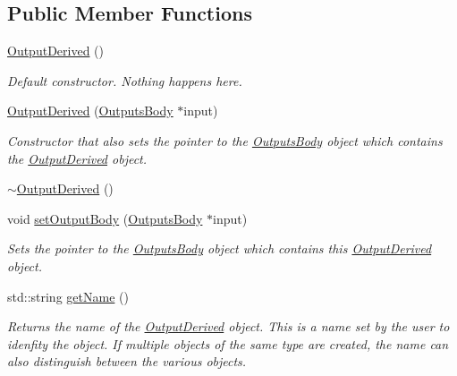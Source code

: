 \subsection*{Public Member Functions}
\begin{DoxyCompactItemize}
\item 
\hyperlink{classosea_1_1ofreq_1_1_output_derived_af8b70b70b8a5089f2b673da8b59a7b6a}{Output\-Derived} ()
\begin{DoxyCompactList}\small\item\em Default constructor. Nothing happens here. \end{DoxyCompactList}\item 
\hyperlink{classosea_1_1ofreq_1_1_output_derived_aa35993ef6d6da030cf74bca52b142ac1}{Output\-Derived} (\hyperlink{classosea_1_1ofreq_1_1_outputs_body}{Outputs\-Body} $\ast$input)
\begin{DoxyCompactList}\small\item\em Constructor that also sets the pointer to the \hyperlink{classosea_1_1ofreq_1_1_outputs_body}{Outputs\-Body} object which contains the \hyperlink{classosea_1_1ofreq_1_1_output_derived}{Output\-Derived} object. \end{DoxyCompactList}\item 
\hyperlink{classosea_1_1ofreq_1_1_output_derived_a4dde733443e52964c74d8bb6477f85f7}{$\sim$\-Output\-Derived} ()
\item 
void \hyperlink{classosea_1_1ofreq_1_1_output_derived_affb9fc146d9322b1d991cc5f5ae546d7}{set\-Output\-Body} (\hyperlink{classosea_1_1ofreq_1_1_outputs_body}{Outputs\-Body} $\ast$input)
\begin{DoxyCompactList}\small\item\em Sets the pointer to the \hyperlink{classosea_1_1ofreq_1_1_outputs_body}{Outputs\-Body} object which contains this \hyperlink{classosea_1_1ofreq_1_1_output_derived}{Output\-Derived} object. \end{DoxyCompactList}\item 
std\-::string \hyperlink{classosea_1_1ofreq_1_1_output_derived_a354f906f29b96022141afba02a50fbfe}{get\-Name} ()
\begin{DoxyCompactList}\small\item\em Returns the name of the \hyperlink{classosea_1_1ofreq_1_1_output_derived}{Output\-Derived} object. This is a name set by the user to idenfity the object. If multiple objects of the same type are created, the name can also distinguish between the various objects. \end{DoxyCompactList}\item 

\end{DoxyCompactItemize}
